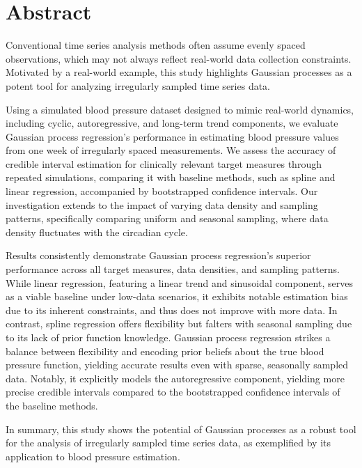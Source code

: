 \chapter*{Abstract}
Conventional time series analysis methods often assume evenly spaced observations,
which may not always reflect real-world data collection constraints.
Motivated by a real-world example, this study highlights Gaussian
processes as a potent tool for analyzing irregularly sampled
time series data.

Using a simulated blood pressure dataset designed to mimic real-world dynamics,
including cyclic, autoregressive, and long-term trend components,
we evaluate Gaussian process regression's performance in estimating
blood pressure values from one week of irregularly spaced measurements.
We assess the accuracy of credible interval estimation for clinically relevant
target measures through repeated simulations, comparing it with baseline methods,
such as spline and linear regression, accompanied by bootstrapped confidence intervals.
Our investigation extends to the impact of varying data density and sampling patterns,
specifically comparing uniform and seasonal sampling, where data density fluctuates with the circadian cycle.

Results consistently demonstrate Gaussian process regression's superior
performance across all target measures,
data densities, and sampling patterns.
While linear regression, featuring a linear trend and sinusoidal component,
serves as a viable baseline under low-data scenarios, it exhibits notable
estimation bias due to its inherent constraints, and thus does not improve with more data.
In contrast, spline regression offers flexibility but falters with seasonal
sampling due to its lack of prior function knowledge.
Gaussian process regression strikes a balance between flexibility and encoding
prior beliefs about the true blood pressure function, yielding accurate results
even with sparse, seasonally sampled data.
Notably, it explicitly models the autoregressive component,
yielding more precise credible intervals compared to the bootstrapped
confidence intervals of the baseline methods.

In summary, this study shows the potential of Gaussian processes as a
robust tool for the analysis of irregularly sampled time series data, as
exemplified by its application to blood pressure estimation.




